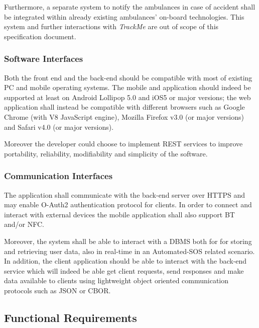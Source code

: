 \documentclass[a4paper]{article}
\begin{document}
        Furthermore, a separate system to notify the ambulances in case of accident shall be integrated within already existing ambulances' on-board technologies. This system and further interactions with \textit{TrackMe} are out of scope of this specification document.
        
        \subsubsection{Software Interfaces}
        Both the front end and the back-end should be compatible with most of existing PC and mobile operating systems. The mobile and application should indeed be supported at least on Android Lollipop 5.0 and iOS5 or major versions; the web application shall instead be compatible with different browsers such as Google Chrome (with V8 JavaScript engine), Mozilla Firefox v3.0 (or major versions) and Safari v4.0 (or major versions).
        
        Moreover the developer could choose to implement REST services to improve portability, reliability, modifiability and simplicity of the software.
        
        \subsubsection{Communication Interfaces}
        The application shall communicate with the back-end server over HTTPS and may enable O-Auth2 authentication protocol for clients. In order to connect and interact with external devices the mobile application shall also support BT and/or NFC.
        
        Moreover, the system shall be able to interact with a DBMS both for for storing and retrieving user data, also in real-time in an Automated-SOS related scenario. In addition, the client application should be able to interact with the back-end service which will indeed be able get client requests, send responses and make data available to clients using lightweight object oriented communication protocols such as JSON or CBOR.

\newpage
\subsection{Functional Requirements}
\end{document}
